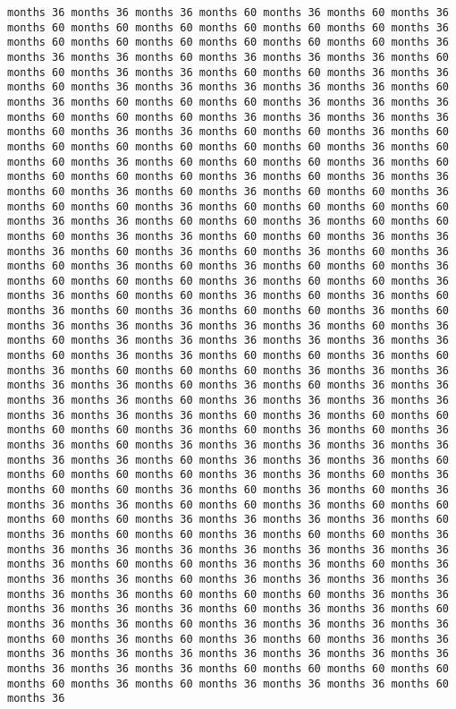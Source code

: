 \documentclass[11pt]{article}
\begin{document}
\begin{Verbatim}[commandchars=\\\{\}, frame=single, framerule=2mm, rulecolor=\color{outerrorbackground}]
months 36 months 36 months 36 months 60 months 36 months 60 months 36 months 60 months 60 months 60 months 60 months 60 months 60 months 36 months 60 months 60 months 60 months 60 months 60 months 60 months 36 months 36 months 36 months 60 months 36 months 36 months 36 months 60 months 60 months 36 months 36 months 60 months 60 months 36 months 36 months 60 months 36 months 36 months 36 months 36 months 36 months 60 months 36 months 60 months 60 months 60 months 36 months 36 months 36 months 60 months 60 months 60 months 36 months 36 months 36 months 36 months 60 months 36 months 36 months 60 months 60 months 36 months 60 months 60 months 60 months 60 months 60 months 60 months 36 months 60 months 60 months 36 months 60 months 60 months 60 months 36 months 60 months 60 months 60 months 60 months 36 months 60 months 36 months 36 months 60 months 36 months 60 months 36 months 60 months 60 months 36 months 60 months 60 months 36 months 60 months 60 months 60 months 60 months 36 months 36 months 60 months 60 months 36 months 60 months 60 months 60 months 36 months 36 months 60 months 60 months 36 months 36 months 36 months 60 months 36 months 60 months 36 months 60 months 36 months 60 months 36 months 60 months 36 months 60 months 60 months 36 months 60 months 60 months 60 months 36 months 60 months 60 months 36 months 36 months 60 months 60 months 36 months 60 months 36 months 60 months 36 months 60 months 36 months 60 months 60 months 36 months 60 months 36 months 36 months 36 months 36 months 36 months 60 months 36 months 60 months 36 months 36 months 36 months 36 months 36 months 36 months 60 months 36 months 36 months 60 months 60 months 36 months 60 months 36 months 60 months 60 months 60 months 36 months 36 months 36 months 36 months 36 months 60 months 36 months 60 months 36 months 36 months 36 months 36 months 60 months 36 months 36 months 36 months 36 months 36 months 36 months 36 months 60 months 36 months 60 months 60 months 60 months 60 months 36 months 60 months 36 months 60 months 36 months 36 months 60 months 36 months 36 months 36 months 36 months 36 months 36 months 36 months 60 months 36 months 36 months 36 months 60 months 60 months 60 months 60 months 36 months 36 months 60 months 36 months 60 months 60 months 36 months 60 months 36 months 60 months 36 months 36 months 36 months 60 months 60 months 36 months 60 months 60 months 60 months 60 months 36 months 36 months 36 months 36 months 60 months 36 months 60 months 60 months 36 months 60 months 60 months 36 months 36 months 36 months 36 months 36 months 36 months 36 months 36 months 36 months 60 months 60 months 36 months 36 months 60 months 36 months 36 months 36 months 60 months 36 months 36 months 36 months 36 months 36 months 36 months 60 months 60 months 60 months 36 months 36 months 36 months 36 months 36 months 60 months 36 months 36 months 60 months 36 months 36 months 60 months 36 months 36 months 36 months 36 months 60 months 36 months 60 months 36 months 60 months 36 months 36 months 36 months 36 months 36 months 36 months 36 months 36 months 36 months 36 months 36 months 36 months 60 months 60 months 60 months 60 months 60 months 36 months 60 months 36 months 36 months 36 months 60 months 36 
\end{Verbatim}
\end{document}
